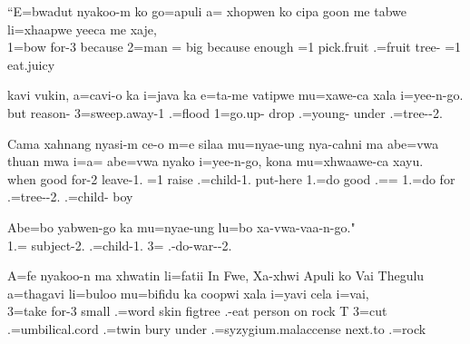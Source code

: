 \ea
\gll ``E=bwadut nyakoo-m ko go=apuli a= xhopwen ko cipa goon me tabwe li=xhaapwe yeeca me xaje,\\  
     1=bow for-3 because 2=man = big because  enough =1 pick.fruit .=fruit tree- =1 eat.juicy\\ 
\glt {}
\z

\ea
\gll kavi vukin, a=cavi-o ka i=java ka e=ta-me vatipwe mu=xawe-ca xala i=yee-n-go.\\ but reason- 3=sweep.away-1  .=flood  1=go.up- drop .=young- under .=tree--2.\\ \glt {}
\z

\ea
\gll Cama xahnang nyasi-m ce-o m=e silaa mu=nyae-ung nya-cahni ma abe=vwa thuan mwa i=a= abe=vwa nyako i=yee-n-go, kona mu=xhwaawe-ca xayu.\\ when good for-2 leave-1. =1 raise .=child-1. put-here  1.=do good  .== 1.=do for .=tree--2.  .=child- boy\\ 
\glt  {}
\z

\ea
\gll Abe=bo  yabwen-go ka mu=nyae-ung lu=bo xa-vwa-vaa-n-go."\\ 1.= subject-2.  .=child-1. 3= .-do-war--2.\\ \glt {}
\z\largerpage

\ea
\gll A=fe nyakoo-n ma xhwatin li=fatii In Fwe, Xa-xhwi Apuli ko Vai Thegulu a=thagavi li=buloo mu=bifidu ka coopwi xala i=yavi cela i=vai,\\ 
     3=take for-3  small .=word skin figtree .-eat person on rock T 3=cut .=umbilical.cord .=twin  bury under .=syzygium.malaccense next.to .=rock\\
 \glt  {} 
 \z
 
